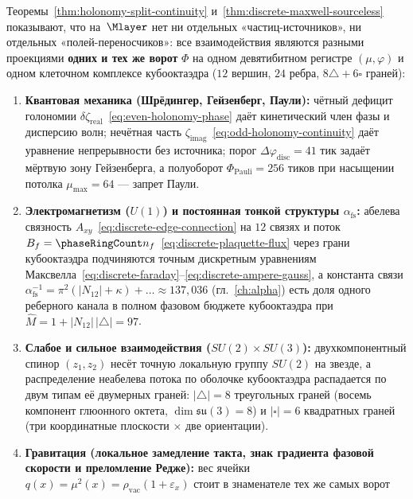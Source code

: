 \begin{remark}
\label{rem:unified-interactions-single-gate}
Теоремы~\ref{thm:holonomy-split-continuity} и~\ref{thm:discrete-maxwell-sourceless} показывают, что на~$\Mlayer$
нет ни отдельных «частиц-источников», ни отдельных «полей-переносчиков»: все взаимодействия являются
разными проекциями \textbf{одних и тех же ворот} $\Phi$ на одном девятибитном регистре $(\mu,\varphi)$
и одном клеточном комплексе кубооктаэдра ($12$ вершин, $24$ ребра, $8\triangle + 6\square$ граней):
\begin{enumerate}[label=(\arabic*)]
\item \textbf{Квантовая механика (Шрёдингер, Гейзенберг, Паули):}
  чётный дефицит голономии $\delta\zeta_{\mathrm{real}}$~\eqref{eq:even-holonomy-phase} даёт кинетический
  член фазы и дисперсию волн; нечётная часть $\zeta_{\mathrm{imag}}$~\eqref{eq:odd-holonomy-continuity}
  даёт уравнение непрерывности без источника; порог $\Delta\varphi_{\mathrm{disc}}=41$ тик задаёт мёртвую зону
  Гейзенберга, а полуоборот $\Phi_{\mathrm{Pauli}}=256$ тиков при насыщении потолка $\mu_{\max}=64$ --- запрет Паули.
\item \textbf{Электромагнетизм ($U(1)$) и постоянная тонкой структуры $\alpha_{\mathrm{fs}}$:}
  абелева связность $A_{xy}$~\eqref{eq:discrete-edge-connection} на $12$ связях и поток $B_f=\phaseRingCount n_f$~\eqref{eq:discrete-plaquette-flux}
  через грани кубооктаэдра подчиняются точным дискретным уравнениям Максвелла~\eqref{eq:discrete-faraday}--\eqref{eq:discrete-ampere-gauss},
  а константа связи $\alpha_{\mathrm{fs}}^{-1}=\pi^2(|N_{12}|+\kappa)+\dots\approx 137{,}036$ (гл.~\ref{ch:alpha})
  есть доля одного реберного канала в полном фазовом бюджете кубооктаэдра при $\hat M = 1+|N_{12}|\,|\triangle| = 97$.
\item \textbf{Слабое и сильное взаимодействия ($SU(2)\times SU(3)$):}
  двухкомпонентный спинор $(z_1,z_2)$ несёт точную локальную группу $SU(2)$ на звезде, а распределение
  неабелева потока по оболочке кубооктаэдра распадается по двум типам её двумерных граней:
  $|\triangle|=8$ треугольных граней (восемь компонент глюонного октета, $\dim\mathfrak{su}(3)=8$)
  и $|\square|=6$ квадратных граней (три координатные плоскости $\times$ две ориентации).
\item \textbf{Гравитация (локальное замедление такта, знак градиента фазовой скорости и преломление Редже):}
  вес ячейки $q(x)=\mu^2(x)=\rho_{\mathrm{vac}}(1+\varepsilon_x)$ стоит в знаменателе тех же самых ворот

\end{enumerate}
\end{remark}
